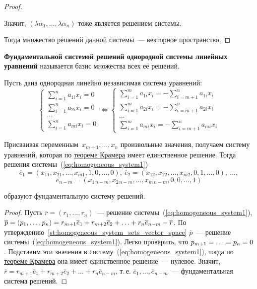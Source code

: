 \begin{proof}
\begin{itemize}
	Значит, $(\lambda \alpha_1, \ldots, \lambda \alpha_n)$ тоже является решением системы.
\end{itemize}

Тогда множество решений данной системы~--- векторное пространство.
\end{proof}

\textbf{Фундаментальной системой решений однородной системы линейных уравнений} называется базис множества всех её решений.

Пусть дана однородная линейно независимая система уравнений:
\begin{equation}
\label{eq:homogeneous_system1}
\begin{cases}
\displaystyle \sum_{i=1}^n a_{1i} x_i = 0 \\
\displaystyle \sum_{i=1}^n a_{2i} x_i = 0 \\
\ldots \\
\displaystyle \sum_{i=1}^n a_{mi} x_i = 0
\end{cases} \Leftrightarrow
\begin{cases}
\displaystyle \sum_{i=1}^m a_{1i} x_i = -\sum_{i=m+1}^n a_{1i} x_i \\
\displaystyle \sum_{i=1}^m a_{2i} x_i = -\sum_{i=m+1}^n a_{2i} x_i \\
\ldots \\
\displaystyle \sum_{i=1}^m a_{mi} x_i = -\sum_{i=m+1}^n a_{mi} x_i
\end{cases}
\end{equation}

Присваивая переменным~$x_{m+1}, \ldots, x_n$ произвольные значения, получаем систему уравнений, которая по \hyperref[th:Cramer]{теореме Крамера} имеет единственное решение.
Тогда решения системы~(\ref*{eq:homogeneous_system1})
\begin{equation*}
\overline e_1 = (x_{11}, x_{21}, \ldots, x_{m1}, 1, 0, \ldots, 0), \
\overline e_2 = (x_{12}, x_{22}, \ldots, x_{m2}, 0, 1, \ldots, 0), \ \ldots,
\end{equation*}
\begin{equation*}
\overline e_{n-m} = (x_{1\, n-m}, x_{2\, n-m}, \ldots, x_{m\, n-m}, 0, 0, \ldots, 1)
\end{equation*}

образуют фундаментальную систему решений.
\begin{proof}
Пусть $\overline r = (r_1, \ldots, r_n)$~--- решение системы~(\ref*{eq:homogeneous_system1}), $\overline p = (p_1, \ldots, p_n) = r_{m+1} \overline e_1 \opbr+ r_{m+2} \overline e_2 \opbr+ \ldots \opbr+ r_n \overline e_{n-m} \opbr- \overline r$.
По утверждению~\ref*{st:homogeneous_system_sets_vector_space} $\overline p$~--- решение системы~(\ref*{eq:homogeneous_system1}).
Легко проверить, что $p_{m+1} \opbr= \ldots \opbr= p_n \opbr= 0$.
Подставим эти значения в систему~(\ref*{eq:homogeneous_system1}), тогда по \hyperref[th:Cramer]{теореме Крамера} она имеет единственное решение~--- нулевое.
Значит, $\overline r = r_{m+1} \overline e_1 + r_{m+2} \overline e_2 + \ldots + r_n \overline e_{n-m}$, т.\,е. $\overline e_1, \ldots, \overline e_{n-m}$~--- фундаментальная система решений.
\end{proof}


